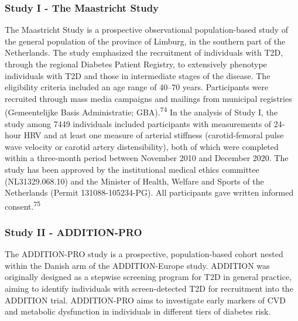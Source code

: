 \documentclass[
  letterpaper,
  headsepline=true,
  open=any]{scrbook}
\begin{document}
\hypertarget{study-i---the-maastricht-study}{%
\subsubsection{Study I - The Maastricht
Study}\label{study-i---the-maastricht-study}}

The Maastricht Study is a prospective observational population-based
study of the general population of the province of Limburg, in the
southern part of the Netherlands. The study emphasized the recruitment
of individuals with T2D, through the regional Diabetes Patient Registry,
to extensively phenotype individuals with T2D and those in intermediate
stages of the disease. The eligibility criteria included an age range of
40--70 years. Participants were recruited through mass media campaigns
and mailings from municipal registries (Gemeentelijke Basis
Administratie; GBA).\textsuperscript{74} In the analysis of Study I, the
study among 7449 individuals included participants with measurements of
24-hour HRV and at least one measure of arterial stiffness
(carotid-femoral pulse wave velocity or carotid artery distensibility),
both of which were completed within a three-month period between
November 2010 and December 2020. The study has been approved by the
institutional medical ethics committee (NL31329.068.10) and the Minister
of Health, Welfare and Sports of the Netherlands (Permit
131088-105234-PG). All participants gave written informed
consent.\textsuperscript{75}

\hypertarget{study-ii---addition-pro}{%
\subsubsection{Study II - ADDITION-PRO}\label{study-ii---addition-pro}}

The ADDITION-PRO study is a prospective, population-based cohort nested
within the Danish arm of the ADDITION-Europe study. ADDITION was
originally designed as a stepwise screening program for T2D in general
practice, aiming to identify individuals with screen-detected T2D for
recruitment into the ADDITION trial. ADDITION-PRO aims to investigate
early markers of CVD and metabolic dysfunction in individuals in
different tiers of diabetes risk.
\end{document}
